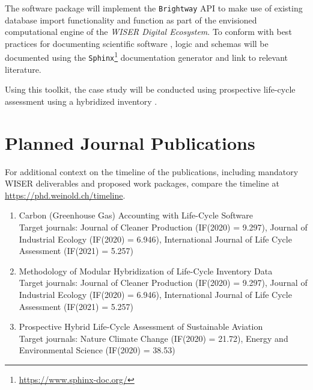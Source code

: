 \documentclass{article}
\begin{document}
    The software package will implement the \texttt{Brightway} API to make use of existing database import functionality and function as part of the envisioned computational engine of the \textit{WISER Digital Ecosystem}. To conform with best practices for documenting scientific software \cite{lee_ten_2018}, logic and schemas will be documented using the \texttt{Sphinx}\footnote{\url{https://www.sphinx-doc.org/}} documentation generator and link to relevant literature.
    
    Using this toolkit, the case study will be conducted using prospective \cite{sacchi_prospective_2022} life-cycle assessment using a hybridized inventory \cite{crawford_hybrid_2018}.


\section{Planned Journal Publications}

    For additional context on the timeline of the publications, including mandatory WISER deliverables and proposed work packages, compare the timeline at \url{https://phd.weinold.ch/timeline}.
    
    \begin{enumerate}
    \setcounter{enumi}{0}
        \item Carbon (Greenhouse Gas) Accounting with Life-Cycle Software \\ Target journals: Journal of Cleaner Production (IF(2020) = 9.297), Journal of Industrial Ecology (IF(2020) = 6.946), International Journal of Life Cycle Assessment (IF(2021) = 5.257)
    \end{enumerate}
    
    \begin{enumerate}
    \setcounter{enumi}{1}
        \item Methodology of Modular Hybridization of Life-Cycle Inventory Data \\ Target journals: Journal of Cleaner Production (IF(2020) = 9.297), Journal of Industrial Ecology (IF(2020) = 6.946), International Journal of Life Cycle Assessment (IF(2021) = 5.257)
    \end{enumerate}
    
    \begin{enumerate}
    \setcounter{enumi}{2}
        \item Prospective Hybrid Life-Cycle Assessment of Sustainable Aviation \\ Target journals: Nature Climate Change (IF(2020) = 21.72), Energy and Environmental Science (IF(2020) = 38.53)
    \end{enumerate}
    
\end{document}
